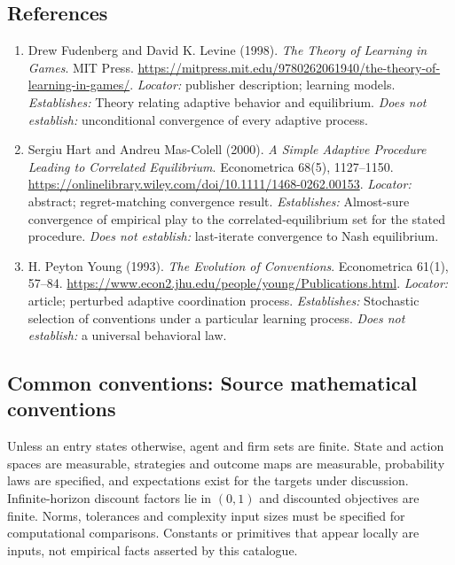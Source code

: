 \documentclass[11pt,a4paper]{article}
\begin{document}
\subsection*{References}

\begin{enumerate}

\item[S1] Drew Fudenberg and David K. Levine (1998). \emph{The Theory of Learning in Games}. MIT Press. \url{https://mitpress.mit.edu/9780262061940/the-theory-of-learning-in-games/}. \textit{Locator:} publisher description; learning models. \textit{Establishes:} Theory relating adaptive behavior and equilibrium. \textit{Does not establish:} unconditional convergence of every adaptive process.

\item[S2] Sergiu Hart and Andreu Mas-Colell (2000). \emph{A Simple Adaptive Procedure Leading to Correlated Equilibrium}. Econometrica 68(5), 1127--1150. \url{https://onlinelibrary.wiley.com/doi/10.1111/1468-0262.00153}. \textit{Locator:} abstract; regret-matching convergence result. \textit{Establishes:} Almost-sure convergence of empirical play to the correlated-equilibrium set for the stated procedure. \textit{Does not establish:} last-iterate convergence to Nash equilibrium.

\item[S3] H. Peyton Young (1993). \emph{The Evolution of Conventions}. Econometrica 61(1), 57--84. \url{https://www.econ2.jhu.edu/people/young/Publications.html}. \textit{Locator:} article; perturbed adaptive coordination process. \textit{Establishes:} Stochastic selection of conventions under a particular learning process. \textit{Does not establish:} a universal behavioral law.

\end{enumerate}

\subsection*{Common conventions: Source mathematical conventions}

Unless an entry states otherwise, agent and firm sets are finite. State and action spaces are measurable, strategies and outcome maps are measurable, probability laws are specified, and expectations exist for the targets under discussion. Infinite-horizon discount factors lie in $(0,1)$ and discounted objectives are finite. Norms, tolerances and complexity input sizes must be specified for computational comparisons. Constants or primitives that appear locally are inputs, not empirical facts asserted by this catalogue.
\end{document}
